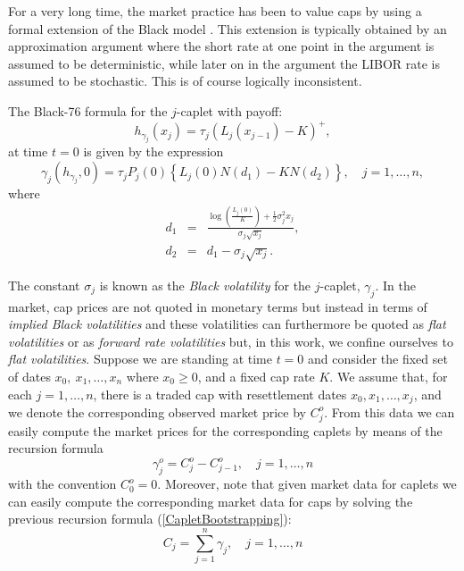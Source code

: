 For a very long time, the market practice has been to value caps by
using a formal extension of the Black model \cite{B:1976}. This
extension is typically obtained by an approximation argument where the
short rate at one point in the argument is assumed to be
deterministic, while later on in the argument the LIBOR rate is
assumed to be stochastic. This is of course logically inconsistent. 
\begin{defn}
The Black-76 formula for the $j$-caplet with payoff: 
$$ 
h_{\gamma_j}(x_j)=\tau_j (L_j(x_{j-1})-K)^+,
$$
at time $t=0$ is given by the expression
\begin{equation}
\label{CapletsBlack76}
\gamma_j(h_{\gamma_j},0)= \tau_j P_j(0) \left\{L_j(0)N(d_1)-KN(d_2)
\right\}, \quad j=1,\dots,n, 
\end{equation}
where
\begin{eqnarray}
\label{d1} d_1 & = & \displaystyle
\frac{\log\left(\frac{L_j(0)}{K}\right)+\frac{1}{2}\sigma^2_jx_j}{\sigma_j\sqrt{x_j}}   
,\\ 
\label{d2} d_2 & = & d_1-\sigma_j \sqrt{x_j}.
\end{eqnarray}
\end{defn}
The constant $\sigma_j$ is known as the \emph{Black volatility} for
the $j$-caplet, $\gamma_j$. In the market, cap prices are not quoted
in monetary terms but instead in terms of \emph{implied Black
  volatilities} and these volatilities can furthermore be quoted as
\emph{flat volatilities} or as \emph{forward rate
  volatilities} but, in this work, we confine ourselves to \emph{flat
  volatilities}. Suppose we are standing at time $t=0$ and consider
the fixed set of dates $x_0,~x_1, \dots, x_n$ where $x_0 \geq 0$, and
a fixed cap rate $K$. We assume that, for each $j=1,\dots, n$, there
is a traded cap with resettlement dates $x_0, x_1,\dots, x_j$, and we
denote the corresponding observed market price by $C^o_j$. From this
data we can easily compute the market prices for the corresponding
caplets by means of the recursion formula 
\begin{equation}
\label{CapletBootstrapping}
\gamma_j^o=C_j^o-C_{j-1}^o, \quad j=1,\dots,n
\end{equation}
with the convention $C_0^o=0$. Moreover, note that given market data
for caplets we can easily compute the corresponding market data for
caps by solving the previous recursion formula
(\ref{CapletBootstrapping}): 
\begin{equation}
\label{CapAsCapletStrip}
C_j=\displaystyle \sum_{j=1}^n \gamma_j, \quad j=1,\dots,n
\end{equation}
